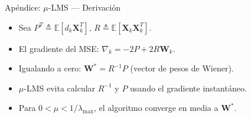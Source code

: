 \documentclass[aspectratio=169,utf8,spanish]{beamer}
\newcommand{\E}{\mathbb{E}}
\begin{document}
\begin{frame}{Apéndice: $\mu$-LMS — Derivación}
  \begin{itemize}
    \item Sea $P^T \triangleq \E[d_k \mathbf{X}_k^T]$, $R \triangleq \E[\mathbf{X}_k \mathbf{X}_k^T]$.
    \item El gradiente del MSE: $\nabla_k = -2P + 2R\mathbf{W}_k$.
    \item Igualando a cero: $\mathbf{W}^* = R^{-1}P$ (vector de pesos de Wiener).
    \item $\mu$-LMS evita calcular $R^{-1}$ y $P$ usando el gradiente instantáneo.
    \item Para $0 < \mu < 1/\lambda_{\max}$, el algoritmo converge en media a $\mathbf{W}^*$.
  \end{itemize}
\end{frame}
\end{document}
